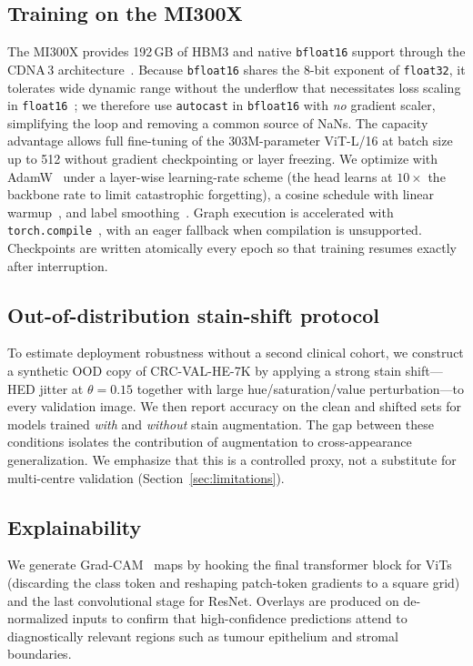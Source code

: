\documentclass[11pt]{article}
\begin{document}
\subsection{Training on the MI300X}
The MI300X provides 192\,GB of HBM3 and native \texttt{bfloat16} support through the CDNA\,3
architecture~\citep{amd2023cdna3}. Because \texttt{bfloat16} shares the 8-bit exponent of
\texttt{float32}, it tolerates wide dynamic range without the underflow that necessitates loss
scaling in \texttt{float16}~\citep{micikevicius2018mixed}; we therefore use \texttt{autocast} in
\texttt{bfloat16} with \emph{no} gradient scaler, simplifying the loop and removing a common source
of NaNs. The capacity advantage allows full fine-tuning of the 303M-parameter ViT-L/16 at batch
size up to 512 without gradient checkpointing or layer freezing. We optimize with
AdamW~\citep{loshchilov2019decoupled} under a layer-wise learning-rate scheme (the head learns at
$10\times$ the backbone rate to limit catastrophic forgetting), a cosine schedule with linear
warmup~\citep{loshchilov2017sgdr}, and label smoothing~\citep{szegedy2016rethinking}. Graph
execution is accelerated with \texttt{torch.compile}~\citep{ansel2024pytorch2}, with an eager
fallback when compilation is unsupported. Checkpoints are written atomically every epoch so that
training resumes exactly after interruption.

\subsection{Out-of-distribution stain-shift protocol}
\label{sec:ood}
To estimate deployment robustness without a second clinical cohort, we construct a synthetic OOD
copy of CRC-VAL-HE-7K by applying a strong stain shift---HED jitter at $\theta=0.15$ together with
large hue/saturation/value perturbation---to every validation image. We then report accuracy on the
clean and shifted sets for models trained \emph{with} and \emph{without} stain augmentation. The
gap between these conditions isolates the contribution of augmentation to cross-appearance
generalization. We emphasize that this is a controlled proxy, not a substitute for multi-centre
validation (Section~\ref{sec:limitations}).

\subsection{Explainability}
We generate Grad-CAM~\citep{selvaraju2017gradcam} maps by hooking the final transformer block for
ViTs (discarding the class token and reshaping patch-token gradients to a square grid) and the last
convolutional stage for ResNet. Overlays are produced on de-normalized inputs to confirm that
high-confidence predictions attend to diagnostically relevant regions such as tumour epithelium and
stromal boundaries.
\end{document}
